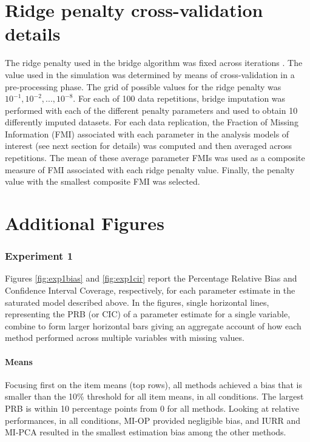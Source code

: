 \documentclass[11pt]{article}
\begin{document}
\section{Ridge penalty cross-validation details}
	The ridge penalty used in the bridge algorithm was fixed across iterations .
	The value used in the simulation was determined by means of cross-validation in a pre-processing phase.
	The grid of possible values for the ridge penalty was $10^{-1}, 10^{-2}, ..., 10^{-8}$.
	For each of 100 data repetitions, bridge imputation was performed with each of the different penalty parameters
	and used to obtain 10 differently imputed datasets.
	For each data replication, the Fraction of Missing Information (FMI) \citep{savaleiRhemtulla:2012} associated with 
	each parameter in the analysis models of interest (see next section for details) was computed and then averaged across 
	repetitions.
	The mean of these average parameter FMIs was used as a composite measure of FMI associated with each ridge penalty
	value.
	Finally, the penalty value with the smallest composite FMI was selected.

\section{Additional Figures}

\subsubsection{Experiment 1}

	Figures \ref{fig:exp1bias} and \ref{fig:exp1cir} report the Percentage Relative Bias and Confidence Interval 
	Coverage, respectively, for each parameter estimate in the saturated model described above. 
	In the figures, single horizontal lines, representing the PRB (or CIC) of a parameter estimate for a single 
	variable, combine to form larger horizontal bars giving an aggregate account of how each method performed 
	across multiple variables with missing values.

	\paragraph{Means} 
	Focusing first on the item means (top rows), all methods achieved a bias that is smaller than the 10\% threshold 
	for all item means, in all conditions.
	The largest PRB is within 10 percentage points from 0 for all methods.
	Looking at relative performances, in all conditions, MI-OP provided negligible bias, and IURR and MI-PCA resulted 
	in the smallest estimation bias among the other methods.
	
\end{document}
